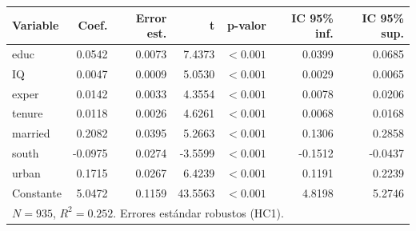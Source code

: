 
\begin{tabular}{lrrrrrr}
\toprule
Variable & Coef. & Error est. & t & p-valor & IC 95\% inf. & IC 95\% sup.\\
\midrule
educ & 0.0542 & 0.0073 & 7.4373 & $<0.001$ & 0.0399 & 0.0685\\
IQ & 0.0047 & 0.0009 & 5.0530 & $<0.001$ & 0.0029 & 0.0065\\
exper & 0.0142 & 0.0033 & 4.3554 & $<0.001$ & 0.0078 & 0.0206\\
tenure & 0.0118 & 0.0026 & 4.6261 & $<0.001$ & 0.0068 & 0.0168\\
married & 0.2082 & 0.0395 & 5.2663 & $<0.001$ & 0.1306 & 0.2858\\
south & -0.0975 & 0.0274 & -3.5599 & $<0.001$ & -0.1512 & -0.0437\\
urban & 0.1715 & 0.0267 & 6.4239 & $<0.001$ & 0.1191 & 0.2239\\
Constante & 5.0472 & 0.1159 & 43.5563 & $<0.001$ & 4.8198 & 5.2746\\
\midrule
\multicolumn{7}{l}{$N=935$, $R^2=0.252$. Errores estándar robustos (HC1).}\\
\bottomrule
\end{tabular}
